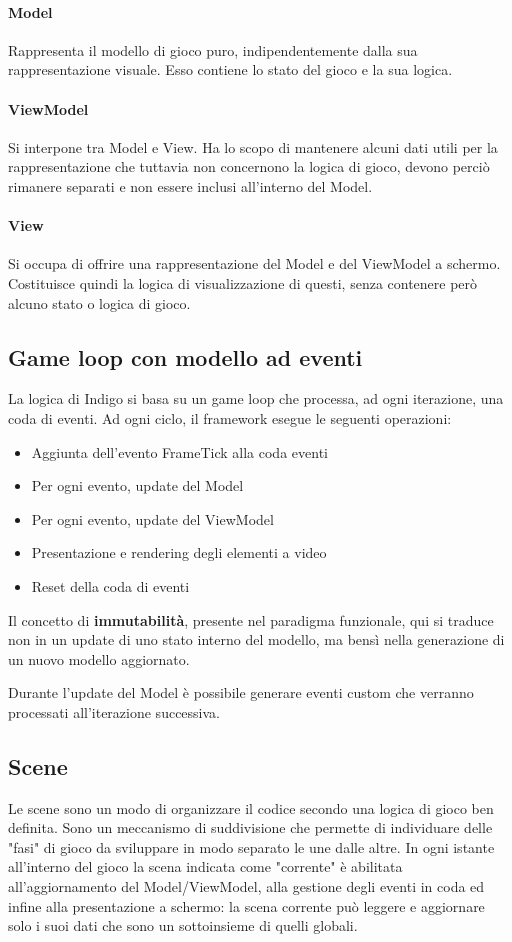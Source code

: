 \paragraph{Model}
Rappresenta il modello di gioco puro, indipendentemente dalla sua rappresentazione visuale. 
Esso contiene lo stato del gioco e la sua logica. 

\paragraph{ViewModel}
Si interpone tra Model e View. Ha lo scopo di mantenere alcuni dati utili per la rappresentazione che tuttavia non concernono la logica di gioco, devono perciò rimanere separati e non essere inclusi all'interno del Model.

\paragraph{View}
Si occupa di offrire una rappresentazione del Model e del ViewModel a schermo. Costituisce quindi la logica di visualizzazione di questi, senza contenere però alcuno stato o logica di gioco.

\subsection{Game loop con modello ad eventi}
La logica di Indigo si basa su un game loop che processa, ad ogni iterazione, una coda di eventi. 
Ad ogni ciclo, il framework esegue le seguenti operazioni:
\begin{itemize}
    \item Aggiunta dell'evento FrameTick alla coda eventi
    \item Per ogni evento, update del Model
    \item Per ogni evento, update del ViewModel
    \item Presentazione e rendering degli elementi a video
    \item Reset della coda di eventi
\end{itemize}

Il concetto di \textbf{immutabilità}, presente nel paradigma funzionale, qui si traduce non in un update di uno stato interno del modello, ma bensì nella generazione di un nuovo modello aggiornato. 

Durante l'update del Model è possibile generare eventi custom che verranno processati all'iterazione successiva. 

\subsection{Scene}
Le scene sono un modo di organizzare il codice secondo una logica di gioco ben definita. Sono un meccanismo di suddivisione che permette di individuare delle "fasi" di gioco da sviluppare in modo separato le une dalle altre.
In ogni istante all'interno del gioco la scena indicata come "corrente" è abilitata all'aggiornamento del Model/ViewModel, alla gestione degli eventi in coda ed infine alla presentazione a schermo: la scena corrente può leggere e aggiornare solo i suoi dati che sono un sottoinsieme di quelli globali. 

